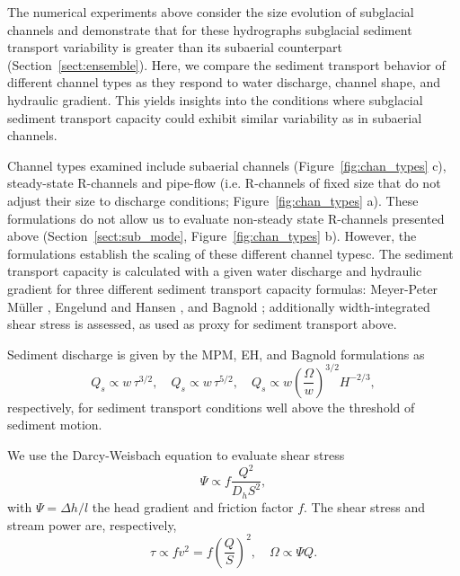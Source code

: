 \documentclass[tc, manuscript]{copernicus}
\begin{document}
The numerical experiments above consider the size evolution of subglacial channels and demonstrate that for these hydrographs subglacial sediment transport variability is greater than its subaerial counterpart (Section~\ref{sect:ensemble}). 
Here, we compare the sediment transport behavior of different channel types as they respond to water discharge, channel shape, and hydraulic gradient. 
This yields insights into the conditions where subglacial sediment transport capacity could exhibit similar variability as in subaerial channels.

Channel types examined include subaerial channels (Figure~\ref{fig:chan_types} c), steady-state R-channels \citep[Figure~\ref{fig:chan_types} d]{rothlisberger1972} and pipe-flow (i.e. R-channels of fixed size that do not adjust their size to discharge conditions; Figure~\ref{fig:chan_types} a).
These formulations do not allow us to evaluate non-steady state R-channels presented above (Section~\ref{sect:sub_mode}, Figure~\ref{fig:chan_types} b).
However, the formulations establish the scaling of these different channel typesc.
The sediment transport capacity is calculated with a given water discharge and hydraulic gradient for three different sediment transport capacity formulas: Meyer-Peter M\"uller  \citep[MPM; ][]{meyer1948}, Engelund and Hansen \citep[EH; ][]{engelund1967}, and Bagnold \citep{bagnold1980}; additionally width-integrated shear stress is assessed, as used as proxy for sediment transport above.


Sediment discharge is given by the MPM, EH, and Bagnold formulations as
\begin{equation}
  \label{eq:Qs_eq}
  Q_s \propto w\, \tau^{3/2}, \quad Q_s \propto w\, \tau^{5/2}, \quad Q_s \propto w \left(\frac{\Omega}{w}\right)^{3/2} H^{-2/3},
\end{equation}
respectively, for sediment transport conditions well above the threshold of sediment motion.

We use the Darcy-Weisbach equation to evaluate shear stress
\begin{equation}
  \label{eq:DW}
  \Psi \propto f\frac{Q^2}{D_h S^2},
\end{equation}
with $\Psi = \Delta h / l$ the head gradient and friction factor $f$.
The shear stress and stream power are, respectively,
\begin{equation}
  \label{eq:tau-omega}
  \tau \propto f v^2 = f \left(\frac{Q}{S}\right)^2, \quad  \Omega \propto \Psi Q.
\end{equation}
% 
\end{document}
